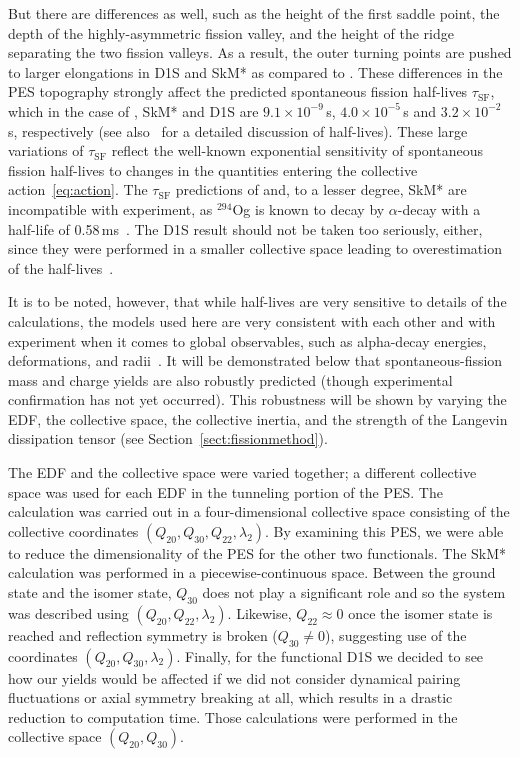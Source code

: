 But there are differences as well, such as the height of the first saddle point, the depth of the highly-asymmetric fission valley, and the height of the ridge separating the two fission valleys. As a result, the outer turning points are pushed to larger elongations in D1S and SkM* as compared to \hfb{}. These differences in the PES topography strongly affect the predicted spontaneous fission half-lives $\tau_\mathrm{SF}$, which in the case of \hfb{}, SkM* and D1S are $9.1\times10^{-9}\,$s, $4.0\times10^{-5}\,$s and $3.2\times10^{-2}\,$s, respectively (see also~\cite{Staszczak2013,Baran2015} for a detailed discussion of half-lives). These large variations of $\tau_\mathrm{SF}$ reflect the well-known exponential sensitivity of spontaneous fission half-lives to changes in the quantities entering the collective action~\eqref{eq:action}. The $\tau_\mathrm{SF}$ predictions of \hfb{} and, to a lesser degree,  SkM* are incompatible with experiment, as $^{294}$Og  is known to  decay by $\alpha$-decay with a half-life of 0.58\,ms~\cite{Brewer2018}. The D1S result should not be taken too seriously, either, since they were performed in a smaller collective space leading to overestimation of the half-lives~\cite{Giuliani2014,Sadhukhan2014}.

It is to be noted, however, that while half-lives are very sensitive to details of the calculations, the models used here are very consistent with each other and with experiment when it comes to global observables, such as alpha-decay energies, deformations, and radii~\cite{Heenen2015,Giuliani2019}. It will be demonstrated below that spontaneous-fission mass and charge yields are also robustly predicted (though experimental confirmation has not yet occurred). This robustness will be shown by varying the EDF, the collective space, the collective inertia, and the strength of the Langevin dissipation tensor (see Section~\ref{sect:fissionmethod}).

The EDF and the collective space were varied together; a different collective space was used for each EDF in the tunneling portion of the PES. The {\hfb} calculation was carried out in a four-dimensional collective space consisting of the collective coordinates $(Q_{20}, Q_{30}, Q_{22}, \lambda_2)$. By examining this PES, we were able to reduce the dimensionality of the PES for the other two functionals. The SkM* calculation was performed in a piecewise-continuous space. Between the ground state and the isomer state, $Q_{30}$ does not play a significant role and so the system was described using  $(Q_{20}, Q_{22}, \lambda_2)$. Likewise, $Q_{22} \approx 0$ once the isomer state is reached and reflection symmetry is broken ($Q_{30} \neq 0$), suggesting use of the coordinates  $(Q_{20}, Q_{30}, \lambda_2)$. Finally, for the functional D1S we decided to see how our yields would be affected if we did not consider dynamical pairing fluctuations or axial symmetry breaking at all, which results in a drastic reduction to computation time. Those calculations were performed in the collective space $(Q_{20}, Q_{30})$.

